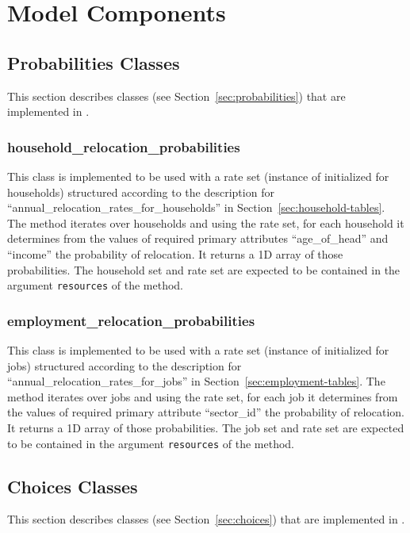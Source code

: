 \section{Model Components}
\modelsindex
%
\label{sec:urbansim-model-components}
%
\subsection{Probabilities Classes}
%
\label{sec:urbansim-probabilities}
This section describes  classes (see
Section~\ref{sec:probabilities}) that are implemented in .

\subsubsection{household_relocation_probabilities}
%
This class is implemented to be used with a rate set (instance of
 initialized for households) structured according to the
description for ``annual_relocation_rates_for_households'' in
Section~\ref{sec:household-tables}. The  method iterates over
households and using the rate set, for each household it determines from the
values of required primary attributes \primaryattributesindex ``age_of_head'' and ``income'' the
probability of relocation. It returns a 1D array of those probabilities. The
household set and rate set are expected to be contained in the argument
\verb|resources| of the  method.

\subsubsection{employment_relocation_probabilities}
%
This class is implemented to be used with a rate set (instance of
 initialized for jobs) structured according to the description
for ``annual_relocation_rates_for_jobs'' in
Section~\ref{sec:employment-tables}. The  method iterates over
jobs and using the rate set, for each job it determines from the values of
required primary attribute \primaryattributesindex ``sector_id'' the probability of relocation. It
returns a 1D array of those probabilities. The job set and rate set are
expected to be contained in the argument \verb|resources| of the
 method.

%
\subsection{Choices Classes}
%
\label{sec:urbansim-choices}
This section describes  classes (see
Section~\ref{sec:choices}) that are implemented in .

